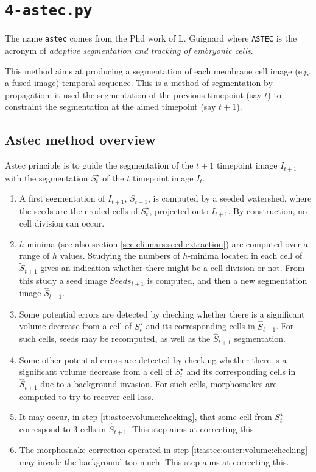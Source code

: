 \section{\texttt{4-astec.py}}
\label{sec:cli:astec}

The name \texttt{astec} comes from the Phd work of L. Guignard \cite{guignard:tel-01278725} where \texttt{ASTEC} is the acronym of \textit{adaptive segmentation and tracking of embryonic cells}.

This method aims at producing a segmentation of each membrane cell image  (e.g. a fused image) temporal sequence. This is a method of segmentation by propagation: it used the segmentation of the previous timepoint (say $t$) to constraint the segmentation at the aimed timepoint (say $t+1$).


\subsection{Astec method overview}

Astec principle is to guide the segmentation of the $t+1$ timepoint image $I_{t+1}$ with the segmentation $S^\star_t$ of the $t$ timepoint image $I_t$.

\begin{enumerate}
\item \label{it:astec:projected:segmentation} A first segmentation of $I_{t+1}$, $\tilde{S}_{t+1}$, is computed by a seeded watershed, where the seeds are the eroded cells of $S^\star_t$, projected onto $I_{t+1}$. By construction, no cell division can occur.
\item \label{it:astec:optimal:seeds} $h$-minima (see also section 
\ref{sec:cli:mars:seed:extraction}) are computed over a range of $h$ values. Studying the numbers of $h$-minima located in each cell of $\tilde{S}_{t+1}$ gives an indication whether there might be a cell division or not. From this study a seed image $Seeds_{t+1}$ is computed, and then a new segmentation image $\hat{S}_{t+1}$.
\item \label{it:astec:volume:checking} Some potential errors are detected by checking whether there is a significant volume decrease from a cell of $S^\star_t$ and its corresponding cells in $\hat{S}_{t+1}$. For such cells, seeds may be recomputed, as well as the $\hat{S}_{t+1}$ segmentation.
\item \label{it:astec:outer:volume:checking} Some other potential errors are detected by checking whether there is a significant volume decrease from a cell of $S^\star_t$ and its corresponding cells in $\hat{S}_{t+1}$ due to a background invasion. For such cells, morphosnakes \cite{marquez-neil:pami:2014} are computed to try to recover cell loss.
\item \label{it:astec:multiple:label:fusion} It may occur, in step \ref{it:astec:volume:checking}, that some cell from $S^\star_t$ correspond to 3 cells in $\hat{S}_{t+1}$. This step aims at correcting this.
\item \label{it:astec:morphosnake:correction} The morphosnake correction operated in step \ref{it:astec:outer:volume:checking} may invade the background too much. This step aims at correcting this.
\end{enumerate}



